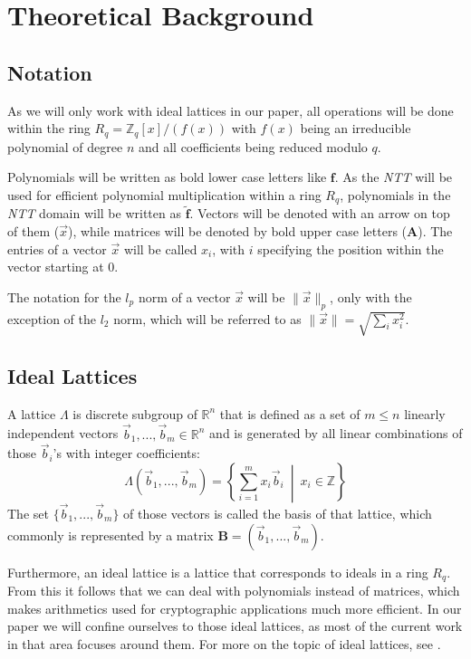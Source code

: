 \chapter{Theoretical Background}

\section{Notation}
As we will only work with ideal lattices in our paper, all operations will be done within the ring \(R_q=\mathbb{Z}_q[x]/(f(x))\) with \(f(x)\) being an irreducible polynomial of degree \(n\) and all coefficients being reduced modulo \(q\).

Polynomials will be written as bold lower case letters like \(\textbf{f}\). As the \textit{\ac{NTT}} will be used for efficient polynomial multiplication within a ring \(R_q\), polynomials in the \textit{\ac{NTT}} domain will be written as \(\tilde{\textbf{f}}\). Vectors will be denoted with an arrow on top of them (\(\vec{x}\)), while matrices will be denoted by bold upper case letters (\(\textbf{A}\)). The entries of a vector \(\vec{x}\) will be called \(x_i\), with \(i\) specifying the position within the vector starting at 0.

The notation for the \(l_p\) norm of a vector \(\vec{x}\) will be \(\|\vec{x}\|_p\), only with the exception of the \(l_2\) norm, which will be referred to as \(\|\vec{x}\|=\sqrt{\sum_{i} x_i^2}\).

\section{Ideal Lattices}
A lattice \(\Lambda\) is discrete subgroup of \(\mathbb{R}^n\) that is defined as a set of \(m \leq n\) linearly independent vectors \(\vec{b}_1,...,\vec{b}_m \in \mathbb{R}^n\) and is generated by all linear combinations of those \(\vec{b}_i\)'s with integer coefficients:
\begin{equation}
	\Lambda(\vec{b}_1,...,\vec{b}_m)=\left \{ \displaystyle \sum_{i=1}^{m} x_i \vec{b}_i \: \middle | \: x_i \in \mathbb{Z} \right \}
\end{equation}
The set \(\{\vec{b}_1,...,\vec{b}_m\}\) of those vectors is called the basis of that lattice, which commonly is represented by a matrix \(\textbf{B}=(\vec{b}_1,...,\vec{b}_m)\).

Furthermore, an ideal lattice is a lattice that corresponds to ideals in a ring \(R_q\). From this it follows that we can deal with polynomials instead of matrices, which makes arithmetics used for cryptographic applications much more efficient. In our paper we will confine ourselves to those ideal lattices, as most of the current work in that area focuses around them. For more on the topic of ideal lattices, see \cite{cryptoeprint:2012:230}.

